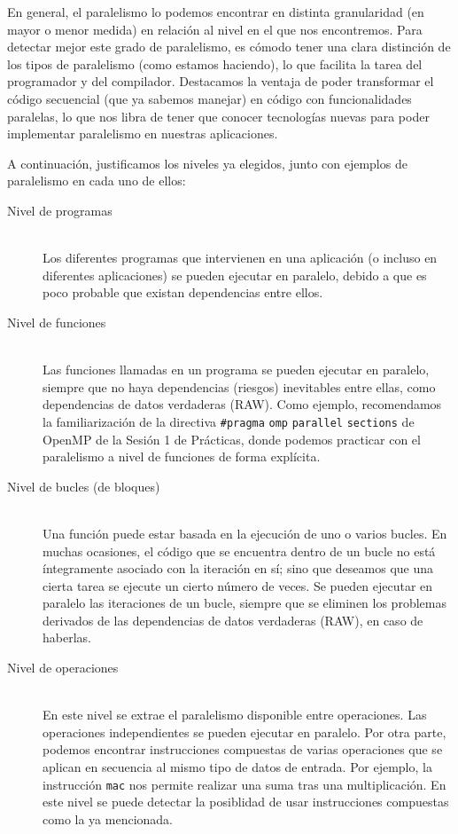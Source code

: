 En general, el paralelismo lo podemos encontrar en distinta granularidad (en mayor o menor medida) en relación al nivel en el que nos encontremos. Para detectar mejor este grado de paralelismo, es cómodo tener una clara distinción de los tipos de paralelismo (como estamos haciendo), lo que facilita la tarea del programador y del compilador. Destacamos la ventaja de poder transformar el código secuencial (que ya sabemos manejar) en código con funcionalidades paralelas, lo que nos libra de tener que conocer tecnologías nuevas para poder implementar paralelismo en nuestras aplicaciones.

A continuación, justificamos los niveles ya elegidos, junto con ejemplos de paralelismo en cada uno de ellos:
\begin{description}
    \item [Nivel de programas]~\\
        Los diferentes programas que intervienen en una aplicación (o incluso en diferentes aplicaciones) se pueden ejecutar en paralelo, debido a que es poco probable que existan dependencias entre ellos.
    \item [Nivel de funciones]~\\
    Las funciones llamadas en un programa se pueden ejecutar en paralelo, siempre que no haya dependencias (riesgos) inevitables entre ellas, como dependencias de datos verdaderas (RAW). Como ejemplo, recomendamos la familiarización de la directiva \verb|#pragma| \verb|omp| \verb|parallel| \verb|sections| de OpenMP de la Sesión 1 de Prácticas, donde podemos practicar con el paralelismo a nivel de funciones de forma explícita.
    \item [Nivel de bucles (de bloques)]~\\
        Una función puede estar basada en la ejecución de uno o varios bucles. En muchas ocasiones, el código que se encuentra dentro de un bucle no está íntegramente asociado con la iteración en sí; sino que deseamos que una cierta tarea se ejecute un cierto número de veces. Se pueden ejecutar en paralelo las iteraciones de un bucle, siempre que se eliminen los problemas derivados de las dependencias de datos verdaderas (RAW), en caso de haberlas.
    \item [Nivel de operaciones]~\\
        En este nivel se extrae el paralelismo disponible entre operaciones. Las operaciones independientes se pueden ejecutar en paralelo. Por otra parte, podemos encontrar instrucciones compuestas de varias operaciones que se aplican en secuencia al mismo tipo de datos de entrada. Por ejemplo, la instrucción \verb|mac| nos permite realizar una suma tras una multiplicación. En este nivel se puede detectar la posiblidad de usar instrucciones compuestas como la ya mencionada.
\end{description}

